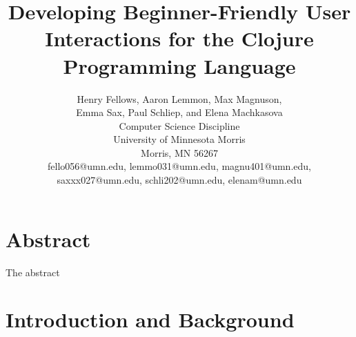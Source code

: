 \documentclass[12pt]{article}
\newcommand{\comment}[1]{}
\newcommand{\escomment}[1]{\textcolor{BlueViolet}{\comment{Emma: {#1}}}}
\begin{document}
\pagestyle{plain}
%

\title{Developing Beginner-Friendly User Interactions for the Clojure Programming Language}
%
%

\author{
Henry Fellows, Aaron Lemmon, Max Magnuson, \\
	Emma Sax, Paul Schliep, and Elena Machkasova \\
Computer Science Discipline \\
University of Minnesota Morris\\
Morris, MN 56267\\
fello056@umn.edu, lemmo031@umn.edu, magnu401@umn.edu, \\
	saxxx027@umn.edu, schli202@umn.edu, elenam@umn.edu
}
\date{}
\maketitle
\thispagestyle{empty}

\section*{\centering Abstract}
The abstract

\newpage
\setcounter{page}{1}

\section{Introduction and Background}\label{sec:intro}
\end{document}
